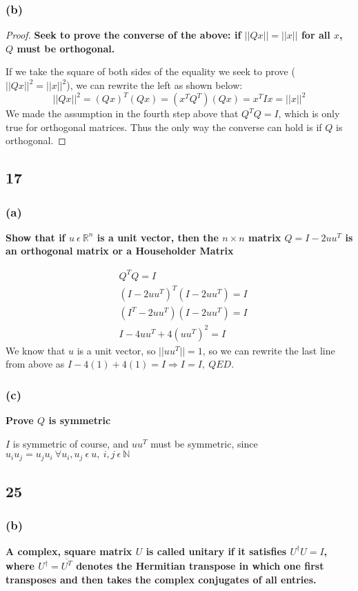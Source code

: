 \documentclass[10pt,letterpaper]{article}
\begin{document}
	\subsubsection*{(b)} \begin{proof}
		\textbf{Seek to prove the converse of the above: if $||Qx|| = ||x||$ for all $x$, $Q$ must be orthogonal. }
		
		If we take the square of both sides of the equality we seek to prove ($||Qx||^2 = ||x||^2$), we can rewrite the left as shown below: 
		$$
		||Qx||^2 = (Qx)^T(Qx) = (x^TQ^T)(Qx) = x^TIx = ||x||^2
		$$
		We made the assumption in the fourth step above that $Q^TQ = I$, which is only true for orthogonal matrices. Thus the only way the converse can hold is if $Q$ is orthogonal. 
	\end{proof}
	\subsection*{17} 
	\subsubsection*{(a)} \textbf{Show that if $u \: \epsilon \: \mathbb{R}^n$ is a unit vector, then the $n \times n$ matrix $Q = I - 2uu^T$ is an orthogonal matrix or a Householder Matrix}
	
	\begin{align*}
	&Q^TQ = I \\ 
	& ( I - 2uu^T)^T(I - 2uu^T) = I \\ 
	& (I^T - 2uu^T)(I - 2uu^T) = I \\ 
	& I - 4uu^T + 4(uu^T)^2 = I
	\end{align*}
	We know that $u$ is a unit vector, so $||uu^T|| = 1$, so we can rewrite the last line from above as $I - 4(1) + 4(1) = I \Rightarrow I = I, \: QED$. 
	\subsubsection*{(c)} \textbf{Prove $Q$ is symmetric}
	
	$I$ is symmetric of course, and $uu^T$ must be symmetric, since $u_iu_j = u_ju_i \: \forall u_i,u_j \: \epsilon \: u, \: i,j \: \epsilon \: \mathbb{N}$  
	\subsection*{25}
	\subsubsection*{(b)} \textbf{A complex, square matrix $U$ is called unitary if it satisfies $U^{\dagger}U = I$, where $U^{\dagger} = \overline{U^T}$ denotes the Hermitian transpose in which one first transposes and then takes the complex conjugates of all entries.} 
	
\end{document}
